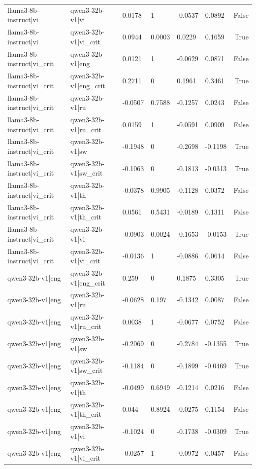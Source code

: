 \begin{table}
\begin{tabular}{llllllr}
llama3-8b-instruct|vi & qwen3-32b-v1|vi & 0.0178 & 1 & -0.0537 & 0.0892 & False \\
llama3-8b-instruct|vi & qwen3-32b-v1|vi_crit & 0.0944 & 0.0003 & 0.0229 & 0.1659 & True \\
llama3-8b-instruct|vi_crit & qwen3-32b-v1|eng & 0.0121 & 1 & -0.0629 & 0.0871 & False \\
llama3-8b-instruct|vi_crit & qwen3-32b-v1|eng_crit & 0.2711 & 0 & 0.1961 & 0.3461 & True \\
llama3-8b-instruct|vi_crit & qwen3-32b-v1|ru & -0.0507 & 0.7588 & -0.1257 & 0.0243 & False \\
llama3-8b-instruct|vi_crit & qwen3-32b-v1|ru_crit & 0.0159 & 1 & -0.0591 & 0.0909 & False \\
llama3-8b-instruct|vi_crit & qwen3-32b-v1|sw & -0.1948 & 0 & -0.2698 & -0.1198 & True \\
llama3-8b-instruct|vi_crit & qwen3-32b-v1|sw_crit & -0.1063 & 0 & -0.1813 & -0.0313 & True \\
llama3-8b-instruct|vi_crit & qwen3-32b-v1|th & -0.0378 & 0.9905 & -0.1128 & 0.0372 & False \\
llama3-8b-instruct|vi_crit & qwen3-32b-v1|th_crit & 0.0561 & 0.5431 & -0.0189 & 0.1311 & False \\
llama3-8b-instruct|vi_crit & qwen3-32b-v1|vi & -0.0903 & 0.0024 & -0.1653 & -0.0153 & True \\
llama3-8b-instruct|vi_crit & qwen3-32b-v1|vi_crit & -0.0136 & 1 & -0.0886 & 0.0614 & False \\
qwen3-32b-v1|eng & qwen3-32b-v1|eng_crit & 0.259 & 0 & 0.1875 & 0.3305 & True \\
qwen3-32b-v1|eng & qwen3-32b-v1|ru & -0.0628 & 0.197 & -0.1342 & 0.0087 & False \\
qwen3-32b-v1|eng & qwen3-32b-v1|ru_crit & 0.0038 & 1 & -0.0677 & 0.0752 & False \\
qwen3-32b-v1|eng & qwen3-32b-v1|sw & -0.2069 & 0 & -0.2784 & -0.1355 & True \\
qwen3-32b-v1|eng & qwen3-32b-v1|sw_crit & -0.1184 & 0 & -0.1899 & -0.0469 & True \\
qwen3-32b-v1|eng & qwen3-32b-v1|th & -0.0499 & 0.6949 & -0.1214 & 0.0216 & False \\
qwen3-32b-v1|eng & qwen3-32b-v1|th_crit & 0.044 & 0.8924 & -0.0275 & 0.1154 & False \\
qwen3-32b-v1|eng & qwen3-32b-v1|vi & -0.1024 & 0 & -0.1738 & -0.0309 & True \\
qwen3-32b-v1|eng & qwen3-32b-v1|vi_crit & -0.0257 & 1 & -0.0972 & 0.0457 & False \\

\end{tabular}
\end{table}
